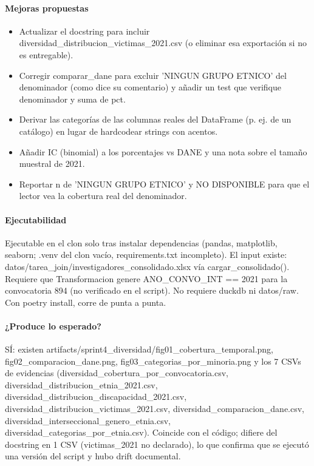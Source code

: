 \paragraph{Mejoras propuestas}
\begin{itemize}
  \item Actualizar el docstring para incluir diversidad\_distribucion\_victimas\_2021.csv (o eliminar esa exportación si no es entregable).
  \item Corregir comparar\_dane para excluir 'NINGUN GRUPO ETNICO' del denominador (como dice su comentario) y añadir un test que verifique denominador y suma de pct.
  \item Derivar las categorías de las columnas reales del DataFrame (p. ej. de un catálogo) en lugar de hardcodear strings con acentos.
  \item Añadir IC (binomial) a los porcentajes vs DANE y una nota sobre el tamaño muestral de 2021.
  \item Reportar n de 'NINGUN GRUPO ETNICO' y NO DISPONIBLE para que el lector vea la cobertura real del denominador.
\end{itemize}

\paragraph{Ejecutabilidad}
Ejecutable en el clon solo tras instalar dependencias (pandas, matplotlib, seaborn; .venv del clon vacío, requirements.txt incompleto). El input existe: datos/tarea\_join/investigadores\_consolidado.xlsx vía cargar\_consolidado(). Requiere que Transformacion genere ANO\_CONVO\_INT == 2021 para la convocatoria 894 (no verificado en el script). No requiere duckdb ni datos/raw. Con poetry install, corre de punta a punta.

\paragraph{¿Produce lo esperado?}
SÍ: existen artifacts/sprint4\_diversidad/fig01\_cobertura\_temporal.png, fig02\_comparacion\_dane.png, fig03\_categorias\_por\_minoria.png y los 7 CSVs de evidencias (diversidad\_cobertura\_por\_convocatoria.csv, diversidad\_distribucion\_etnia\_2021.csv, diversidad\_distribucion\_discapacidad\_2021.csv, diversidad\_distribucion\_victimas\_2021.csv, diversidad\_comparacion\_dane.csv, diversidad\_interseccional\_genero\_etnia.csv, diversidad\_categorias\_por\_etnia.csv). Coincide con el código; difiere del docstring en 1 CSV (victimas\_2021 no declarado), lo que confirma que se ejecutó una versión del script y hubo drift documental.

